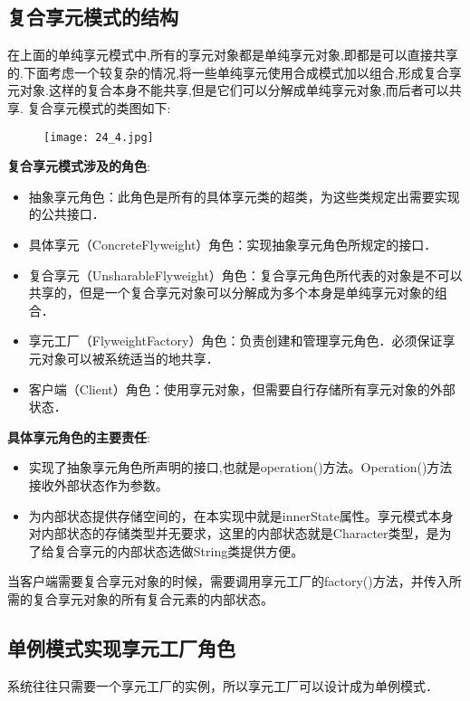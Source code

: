 \documentclass[../main.tex]{subfiles}
\begin{document}
\subsection{复合享元模式的结构}
在上面的单纯享元模式中,所有的享元对象都是单纯享元对象,即都是可以直接共享的.下面考虑一个较复杂的情况,将一些单纯享元使用合成模式加以组合,形成复合享元对象.这样的复合本身不能共享,但是它们可以分解成单纯享元对象,而后者可以共享.
复合享元模式的类图如下:
%
\begin{figure}[H]
  \texttt{[image: 24\_4.jpg]}
\end{figure}
%
\textbf{复合享元模式涉及的角色}:
\begin{itemize}
  \item 抽象享元角色：此角色是所有的具体享元类的超类，为这些类规定出需要实现的公共接口．
  \item 具体享元（ConcreteFlyweight）角色：实现抽象享元角色所规定的接口．
  \item 复合享元（UnsharableFlyweight）角色：复合享元角色所代表的对象是不可以共享的，但是一个复合享元对象可以分解成为多个本身是单纯享元对象的组合．
  \item 享元工厂（FlyweightFactory）角色：负责创建和管理享元角色．必须保证享元对象可以被系统适当的地共享．
  \item 客户端（Client）角色：使用享元对象，但需要自行存储所有享元对象的外部状态．
\end{itemize}
%

%
\textbf{具体享元角色的主要责任}:
\begin{itemize}
  \item 实现了抽象享元角色所声明的接口,也就是operation()方法。Operation()方法接收外部状态作为参数。
  \item 为内部状态提供存储空间的，在本实现中就是innerState属性。享元模式本身对内部状态的存储类型并无要求，这里的内部状态就是Character类型，是为了给复合享元的内部状态选做String类提供方便。
\end{itemize}
%

%

%
当客户端需要复合享元对象的时候，需要调用享元工厂的factory()方法，并传入所需的复合享元对象的所有复合元素的内部状态。

%
\subsection{单例模式实现享元工厂角色}
系统往往只需要一个享元工厂的实例，所以享元工厂可以设计成为单例模式．
\end{document}
